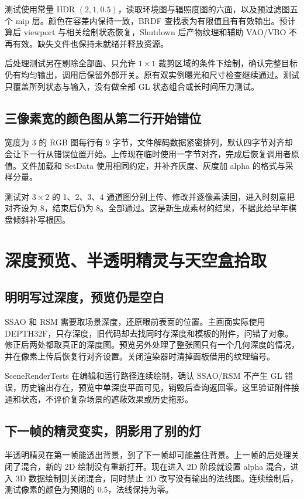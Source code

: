 测试使用常量 HDR $(2,1,0.5)$，读取环境图与辐照度图的六面，以及预过滤图五个 mip 层。颜色在容差内保持一致，BRDF 查找表为有限值且有有效输出。预计算后 viewport 与相关绘制状态恢复，Shutdown 后产物纹理和辅助 VAO/VBO 不再有效。缺失文件也保持未就绪并释放资源。

后处理测试另在剔除全部面、只允许 $1\times1$ 裁剪区域的条件下绘制，确认完整目标仍有均匀输出，调用后保留外部开关。原有双实例曝光和尺寸检查继续通过。测试只覆盖所列状态与输入，没有做全部 GL 状态组合或长时间压力测试。

\subsection{三像素宽的颜色图从第二行开始错位}
宽度为 3 的 RGB 图每行有 9 字节，文件解码数据紧密排列，默认四字节对齐却会让下一行从错误位置开始。上传现在临时使用一字节对齐，完成后恢复调用者原值。文件加载和 SetData 使用相同约定，并补齐灰度、灰度加 alpha 的格式与采样分量。

测试对 $3\times2$ 的 1、2、3、4 通道图分别上传、修改并逐像素读回，进入时刻意把对齐设为 8，结束后仍为 8。全部通过。这是新生成素材的结果，不据此给早年棋盘倾斜补写根因。

\newpage
\section{深度预览、半透明精灵与天空盒拾取}
\subsection{明明写过深度，预览仍是空白}
SSAO 和 RSM 需要取场景深度，还原眼前表面的位置。主画面实际使用 DEPTH32F，只存深度，旧代码却去找同时存深度和模板的附件，问错了对象。修正后两处都取真正的深度图。预览另外处理了整张图只有一个几何深度的情况，并在像素上传后恢复行对齐设置。关闭渲染器时清掉面板借用的纹理编号。

SceneRenderTests 在编辑和运行路径连续绘制，确认 SSAO/RSM 不产生 GL 错误，历史输出存在，预览中单深度平面可见，销毁后查询返回零。这里验证附件接通和状态，不评价复杂场景的遮蔽效果或历史拖影。

\subsection{下一帧的精灵变实，阴影用了别的灯}
半透明精灵在第一帧能透出背景，到了下一帧却可能盖住背景。上一帧的后处理关闭了混合，新的 2D 绘制没有重新打开。现在进入 2D 阶段就设置 alpha 混合，进入 3D 数据绘制则关闭混合，同时禁止 2D 改写没有输出的法线图。连续绘制后，测试像素的颜色为预期的 0.5，法线保持为零。

